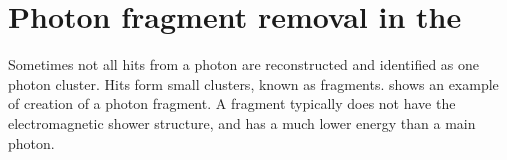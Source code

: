 



\section{Photon fragment removal in the \ECAL}
\label{sec:photonFragRemoval}

Sometimes not all hits from a photon are reconstructed and identified as one photon cluster. Hits form small clusters, known as fragments.  shows an example of creation of a photon fragment. A fragment typically does not have the electromagnetic shower structure, and has a much lower energy than a main photon.




